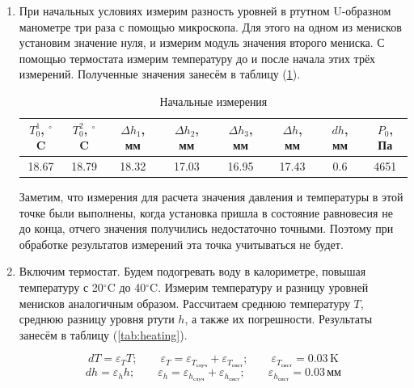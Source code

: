 \documentclass[a4paper,12pt]{article} %
\begin{document}
\begin{enumerate}
  \item При начальных условиях измерим разность уровней в ртутном U-образном манометре три раза с помощью микроскопа. 
  Для этого на одном из менисков установим значение нуля, и измерим модуль значения второго мениска. 
  С помощью термостата измерим температуру до и после начала этих трёх измерений. 
  Полученные значения занесём в таблицу (\ref{tab:init}). 

  \begin{table}[h]
    \caption{Начальные измерения}
    \centering
        \begin{tabular}{|c|c|c|c|c|c|c|c|}
    \hline $T_{0}^1$, $^\circ$C & $T_{0}^2$, $^\circ$C & $\Delta h_1$, мм & $\Delta h_2$, мм & $\Delta h_3$, мм & $\Delta h$, мм & $dh$, мм & $P_{0}$, Па  \\
    \hline  18.67 & 18.79 & 18.32 & 17.03 & 16.95 & 17.43 & 0.6 & 4651\\
    \hline
\end{tabular}
    \label{tab:init}
\end{table}

  Заметим, что измерения для расчета значения давления и температуры в этой точке были выполнены, 
  когда установка пришла в состояние равновесия не до конца, отчего значения получились недостаточно точными. 
  Поэтому при обработке результатов измерений эта точка учитываться не будет.

  \item Включим термостат. 
  Будем подогревать воду в калориметре, повышая температуру с 20$^\circ$C до 40$^\circ$C. 
  Измерим температуру и разницу уровней менисков аналогичным образом. 
  Рассчитаем среднюю температуру $T$, среднюю разницу уровня ртути $h$, а также их погрешности. 
  Результаты занесём в таблицу (\ref{tab:heating}).

  \begin{equation}
    dT = \varepsilon_T T; \qquad \varepsilon_T = \varepsilon_{T_{\text{случ}}} + \varepsilon_{T_{\text{сист}}}; \qquad \varepsilon_{T_{\text{сист}}} = 0.03\,\text{K}
  \end{equation}
  \begin{equation}
    dh = \varepsilon_h h; \qquad \varepsilon_h = \varepsilon_{h_{\text{случ}}} + \varepsilon_{h_{\text{сист}}}; \qquad \varepsilon_{h_{\text{сист}}} = 0.03\,\text{мм}
  \end{equation}


\end{enumerate}
\end{document}
